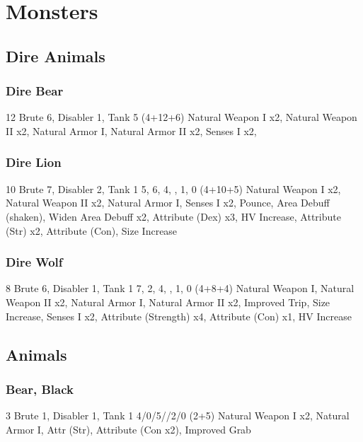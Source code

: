 \section{Monsters}

\subsection{Dire Animals}
\subsubsection{Dire Bear}
 12
 Brute 6, Disabler 1, Tank 5
 (4+12+6) Natural Weapon I x2, Natural Weapon II x2, Natural Armor I, Natural Armor II x2, Senses I x2, 

\subsubsection{Dire Lion}
 10
 Brute 7, Disabler 2, Tank 1
 5, 6, 4, , 1, 0
 (4+10+5) Natural Weapon I x2, Natural Weapon II x2, Natural Armor I, Senses I x2, Pounce, Area Debuff (shaken), Widen Area Debuff x2, Attribute (Dex) x3, HV Increase, Attribute (Str) x2, Attribute (Con), Size Increase

\subsubsection{Dire Wolf}
 8
 Brute 6, Disabler 1, Tank 1
 7, 2, 4, , 1, 0
 (4+8+4) Natural Weapon I, Natural Weapon II x2, Natural Armor I, Natural Armor II x2, Improved Trip, Size Increase, Senses I x2, Attribute (Strength) x4, Attribute (Con) x1, HV Increase

\subsection{Animals}

\subsubsection{Bear, Black}
 3
 Brute 1, Disabler 1, Tank 1
 4/0/5//2/0
 (2+5) Natural Weapon I x2, Natural Armor I, Attr (Str), Attribute (Con x2), Improved Grab

